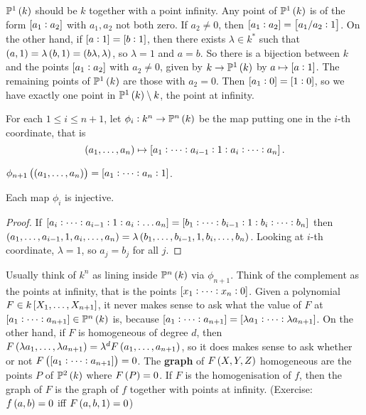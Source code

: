 \begin{example*}
$ \P^1\br{k} $ should be $ k $ together with a point infinity. Any point of $ \P^1\br{k} $ is of the form $ \sbr{a_1 : a_2} $ with $ a_1, a_2 $ not both zero. If $ a_2 \ne 0 $, then $ \sbr{a_1 : a_2} = \sbr{a_1 / a_2 : 1} $. On the other hand, if $ \sbr{a : 1} = \sbr{b : 1} $, then there exists $ \lambda \in k^* $ such that $ \br{a, 1} = \lambda\br{b, 1} = \br{b\lambda, \lambda} $, so $ \lambda = 1 $ and $ a = b $. So there is a bijection between $ k $ and the points $ \sbr{a_1 : a_2} $ with $ a_2 \ne 0 $, given by $ k \to \P^1\br{k} $ by $ a \mapsto \sbr{a : 1} $. The remaining points of $ \P^1\br{k} $ are those with $ a_2 = 0 $. Then $ \sbr{a_1 : 0} = \sbr{1 : 0} $, so we have exactly one point in $ \P^1\br{k} \setminus k $, the point at infinity.
\end{example*}

For each $ 1 \le i \le n + 1 $, let $ \phi_i : k^n \to \P^n\br{k} $ be the map putting one in the $ i $-th coordinate, that is
$$ \br{a_1, \dots, a_n} \mapsto \sbr{a_1 : \dots : a_{i - 1} : 1 : a_i : \dots : a_n}. $$

\begin{example*}
$ \phi_{n + 1}\br{\br{a_1, \dots, a_n}} = \sbr{a_1 : \dots : a_n : 1} $.
\end{example*}

\begin{lemma}
Each map $ \phi_i $ is injective.
\end{lemma}

\begin{proof}
If $ \sbr{a_i : \dots : a_{i - 1} : 1 : a_i : \dots a_n} = \sbr{b_1 : \dots : b_{i - 1} : 1 : b_i : \dots : b_n} $ then $ \br{a_1, \dots, a_{i - 1}, 1, a_i, \dots, a_n} = \lambda\br{b_1, \dots, b_{i - 1}, 1, b_i, \dots, b_n} $. Looking at $ i $-th coordinate, $ \lambda = 1 $, so $ a_j = b_j $ for all $ j $.
\end{proof}

Usually think of $ k^n $ as lining inside $ \P^n\br{k} $ via $ \phi_{n + 1} $. Think of the complement as the points at infinity, that is the points $ \sbr{x_1 : \dots : x_n : 0} $. Given a polynomial $ F \in k\sbr{X_1, \dots, X_{n + 1}} $, it never makes sense to ask what the value of $ F $ at $ \sbr{a_1 : \dots : a_{n + 1}} \in \P^n\br{k} $ is, because $ \sbr{a_1 : \dots : a_{n + 1}} = \sbr{\lambda a_1 : \dots : \lambda a_{n + 1}} $. On the other hand, if $ F $ is homogeneous of degree $ d $, then $ F\br{\lambda a_1, \dots, \lambda a_{n + 1}} = \lambda^d F\br{a_1, \dots, a_{n + 1}} $, so it does makes sense to ask whether or not $ F\br{\sbr{a_1 : \dots : a_{n + 1}}} = 0 $. The \textbf{graph} of $ F\br{X, Y, Z} $ homogeneous are the points $ P $ of $ \P^2\br{k} $ where $ F\br{P} = 0 $. If $ F $ is the homogenisation of $ f $, then the graph of $ F $ is the graph of $ f $ together with points at infinity. (Exercise: $ f\br{a, b} = 0 $ iff $ F\br{a, b, 1} = 0 $)

